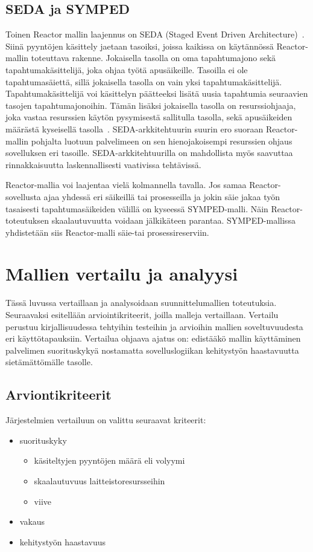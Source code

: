 \documentclass[finnish]{tktltiki2}%
\theoremstyle{definition}
\theoremstyle{remark}
\begin{document}
\subsection{SEDA ja SYMPED}

Toinen Reactor mallin laajennus on SEDA (Staged Event Driven Architecture)~\cite{welsh_seda_2001}.
Siinä pyyntöjen käsittely jaetaan tasoiksi, joissa kaikissa on
käytännössä Reactor-mallin toteuttava rakenne. Jokaisella tasolla
on oma tapahtumajono sekä tapahtumakäsittelijä, joka ohjaa työtä
apusäikeille. Tasoilla ei ole tapahtumasäiettä, sillä
jokaisella tasolla on vain yksi tapahtumakäsittelijä.
Tapahtumakäsittelijä voi käsittelyn päätteeksi
lisätä uusia tapahtumia seuraavien tasojen tapahtumajonoihin.
Tämän lisäksi jokaisella tasolla on resurssiohjaaja,
joka vastaa resurssien käytön pysymisestä sallitulla tasolla,
sekä apusäikeiden määrästä kyseisellä tasolla~\cite{welsh_seda_2001}.
SEDA-arkkitehtuurin suurin ero suoraan Reactor-mallin pohjalta luotuun
palvelimeen on sen hienojakoisempi resurssien ohjaus sovelluksen eri tasoille.
SEDA-arkkitehtuurilla on mahdollista myös saavuttaa rinnakkaisuutta
laskennallisesti vaativissa tehtävissä.

Reactor-mallia voi laajentaa vielä kolmannella tavalla.
Jos samaa Reactor-sovellusta ajaa yhdessä eri säikeillä tai prosesseilla
ja jokin säie jakaa työn tasaisesti tapahtumasäikeiden välillä
on kyseessä SYMPED-malli. Näin Reactor-toteutuksen
skaalautuvuutta voidaan jälkikäteen parantaa.
SYMPED-mallissa yhdistetään siis Reactor-malli säie-tai prosessireserviin.


\section{Mallien vertailu ja analyysi}\label{sec:vertailu}
Tässä luvussa vertaillaan ja analysoidaan
suunnittelumallien toteutuksia.
Seuraavaksi esitellään arviointikriteerit,
joilla malleja vertaillaan.
Vertailu perustuu kirjallisuudessa
tehtyihin testeihin ja arvioihin
mallien soveltuvuudesta eri
käyttötapauksiin.
Vertailua ohjaava ajatus on:
edistääkö mallin käyttäminen palvelimen
suorituskykyä 
nostamatta sovelluslogiikan kehitystyön haastavuutta
sietämättömälle tasolle.

\subsection{Arviontikriteerit}


Järjestelmien vertailuun on valittu seuraavat kriteerit:
\begin{itemize}
  \item suorituskyky
    \begin{itemize}
      \item käsiteltyjen pyyntöjen määrä eli volyymi
      \item skaalautuvuus laitteistoresursseihin
      \item viive
    \end{itemize}
  \item vakaus
  \item kehitystyön haastavuus
\end{itemize}
\end{document}
